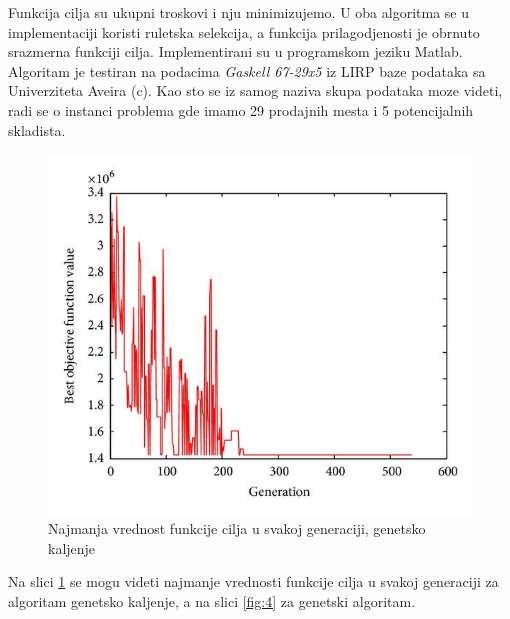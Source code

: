 \documentclass[a4paper]{article}
\begin{document}
Funkcija cilja su ukupni troskovi i nju minimizujemo. U oba algoritma se u implementaciji koristi ruletska selekcija, a funkcija prilagodjenosti je obrnuto srazmerna funkciji cilja. Implementirani su u programskom jeziku Matlab. \\
Algoritam je testiran na podacima \textit{Gaskell 67-29x5} iz LIRP baze podataka sa Univerziteta Aveira (c). Kao sto se iz samog naziva skupa podataka moze videti, radi se o instanci problema gde imamo 29 prodajnih mesta i 5 potencijalnih skladista. 

\begin{figure}[h!]
\centering
\includegraphics[scale= 0.4]{LIRP_Grafik_Genetsko_Kaljenje.jpg}
\caption{Najmanja vrednost funkcije cilja u svakoj generaciji, genetsko kaljenje}
\label{fig:3}
\end{figure}

Na slici \ref{fig:3} se mogu videti najmanje vrednosti funkcije cilja u svakoj generaciji za algoritam genetsko kaljenje, a na slici \ref{fig:4} za genetski algoritam.
\end{document}
